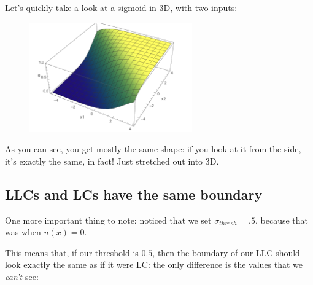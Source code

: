         Let's quickly take a look at a sigmoid in 3D, with two inputs:
        
        \begin{figure}[H]
            \centering
            \includegraphics[width=70mm,scale=0.5]{images/classification_images/llc_3d.png}
        \end{figure}
        
        As you can see, you get mostly the same shape: if you look at it from the side, it's exactly the same, in fact! Just stretched out into 3D.
        

    \subsection*{LLCs and LCs have the same boundary}
        
        One more important thing to note: noticed that we set $\sigma_{thresh}=.5$, because that was when $u(x)=0$.
        
        This means that, if our threshold is $0.5$, then the boundary of our LLC should look exactly the same as if it were LC: the only difference is the values that we \textit{can't} see:
        
